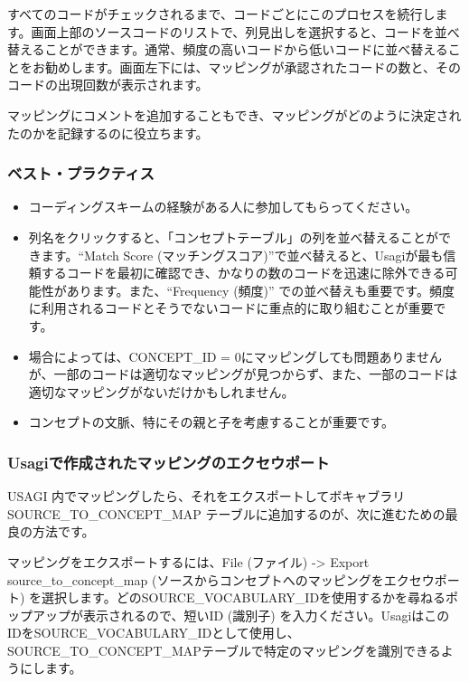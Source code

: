 \documentclass[
  11pt]{book}
\providecommand{\tightlist}{%
  \setlength{\itemsep}{0pt}\setlength{\parskip}{0pt}}
\theoremstyle{definition}
\theoremstyle{definition}
\theoremstyle{definition}
\theoremstyle{definition}
\theoremstyle{remark}
\begin{document}
すべてのコードがチェックされるまで、コードごとにこのプロセスを続行します。画面上部のソースコードのリストで、列見出しを選択すると、コードを並べ替えることができます。通常、頻度の高いコードから低いコードに並べ替えることをお勧めします。画面左下には、マッピングが承認されたコードの数と、そのコードの出現回数が表示されます。

マッピングにコメントを追加することもでき、マッピングがどのように決定されたのかを記録するのに役立ちます。

\subsubsection*{ベスト・プラクティス}\label{ux30d9ux30b9ux30c8ux30d7ux30e9ux30afux30c6ux30a3ux30b9}

\begin{itemize}
\tightlist
\item
  コーディングスキームの経験がある人に参加してもらってください。
\item
  列名をクリックすると、「コンセプトテーブル」の列を並べ替えることができます。``Match Score (マッチングスコア)''で並べ替えると、Usagiが最も信頼するコードを最初に確認でき、かなりの数のコードを迅速に除外できる可能性があります。また、``Frequency (頻度)'' での並べ替えも重要です。頻度に利用されるコードとそうでないコードに重点的に取り組むことが重要です。
\item
  場合によっては、CONCEPT\_ID = 0にマッピングしても問題ありませんが、一部のコードは適切なマッピングが見つからず、また、一部のコードは適切なマッピングがないだけかもしれません。
\item
  コンセプトの文脈、特にその親と子を考慮することが重要です。
\end{itemize}

\subsubsection*{Usagiで作成されたマッピングのエクセウポート}\label{usagiux3067ux4f5cux6210ux3055ux308cux305fux30deux30c3ux30d4ux30f3ux30b0ux306eux30a8ux30afux30bbux30a6ux30ddux30fcux30c8}

USAGI 内でマッピングしたら、それをエクスポートしてボキャブラリ SOURCE\_TO\_CONCEPT\_MAP テーブルに追加するのが、次に進むための最良の方法です。

マッピングをエクスポートするには、File (ファイル) -\textgreater{} Export source\_to\_concept\_map (ソースからコンセプトへのマッピングをエクセウポート) を選択します。どのSOURCE\_VOCABULARY\_IDを使用するかを尋ねるポップアップが表示されるので、短いID (識別子) を入力ください。UsagiはこのIDをSOURCE\_VOCABULARY\_IDとして使用し、SOURCE\_TO\_CONCEPT\_MAPテーブルで特定のマッピングを識別できるようにします。
\end{document}

